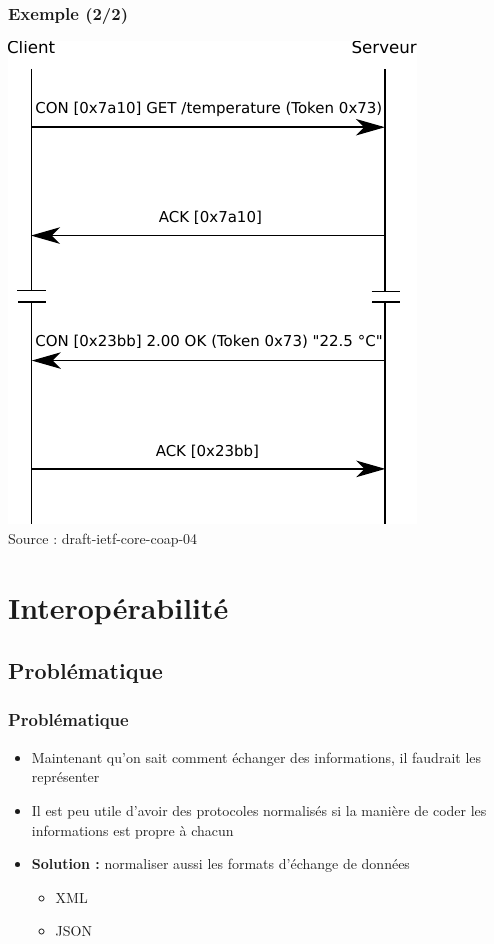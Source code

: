 \documentclass{beamer}
\begin{document}
\begin{frame}
  \frametitle{Exemple (2/2)}
  \begin{center}
  \includegraphics[height=0.8\textheight]{ex2}\\
    \tiny Source : draft-ietf-core-coap-04
  \end{center}
\end{frame}

\section{Interopérabilité}

    \subsection{Problématique}
        \begin{frame}
            \frametitle{Problématique}
            \begin{itemize}
                \item Maintenant qu'on sait comment échanger des informations, il faudrait les représenter \pause
                \item Il est peu utile d'avoir des protocoles normalisés si la manière de coder les informations est propre à chacun \pause
                \item \textbf{Solution :} normaliser aussi les formats d'échange de données \pause
                        \begin{itemize}
                            \item XML
                            \item JSON
                        \end{itemize}
                
            \end{itemize}
        \end{frame}
    
\end{document}
